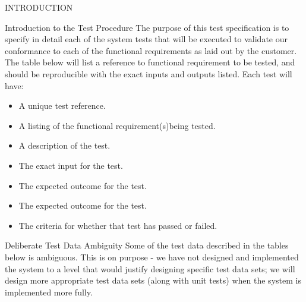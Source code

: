 \documentclass{article}
\begin{document}
\begin{section}{INTRODUCTION}
		\begin{subsection}{Introduction to the Test Procedure}
			The purpose of this test specification is to specify in detail each of the system tests that will be executed to validate our conformance to each of the functional requirements as laid out by the customer.
The table below will list a reference to functional requirement to be tested, and should be reproducible with the exact inputs and outputs listed.
Each test will have:
			\begin{itemize}
				\item{A unique test reference.}
				\item{A listing of the functional requirement(s)being tested.}
				\item{A description of the test.}
				\item{The exact input for the test.}
				\item{The expected outcome for the test.}
				\item{The expected outcome for the test.}
				\item{The criteria for whether that test has passed or failed.}
			\end{itemize}
		\end{subsection}
		
		\begin{subsection}{Deliberate Test Data Ambiguity}
			Some of the test data described in the tables below is ambiguous. This is on purpose - we have not designed and implemented the system to a level that would justify designing specific test data sets; we will design more appropriate test data sets (along with unit tests) when the system is implemented more fully.
		\end{subsection}
	\end{section}
	
\end{document}
